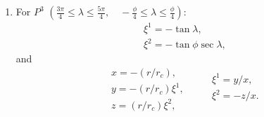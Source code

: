 \documentclass{report}
\begin{document}
\begin{enumerate}
\item For $P^3$ $\left(\frac{3\pi}{4} \leq \lambda \leq  \frac{5\pi}{4}, \quad -\frac{\phi}{4} \leq \lambda \leq  \frac{\phi}{4} \right)$:
\begin{equation} \label{eq:P3-sphere-to-cube}
    \begin{array}{l}
        \xi^1 = - \tan \lambda ,\\
        \xi^2 = - \tan \phi \sec \lambda ,
    \end{array}
\end{equation}
and
\begin{equation}\label{eq:P3-cube-to-global-and-vice-versa}
    \begin{array}{l}
        x = -(r/r_c),  \\
        y = -(r/r_c) \xi^1,\\
        z = (r/r_c) \xi^2,
    \end{array}
    \qquad 
    \begin{array}{l}
        \xi^1 = {y}/{x}, \\
        \xi^2 = - {z}/{x} .\\
    \end{array}
\end{equation}



\end{enumerate}
\end{document}
